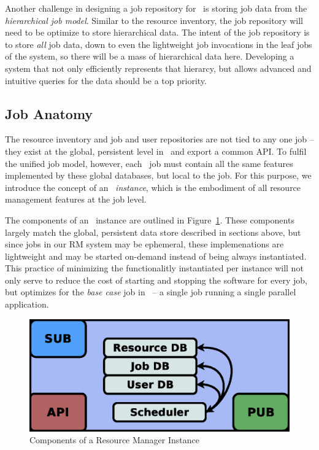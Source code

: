 Another challenge in designing a job repository for \ngrm\ is
storing job data from the \emph{hierarchical job model}. Similar
to the resource inventory, the job repository will need to be
optimize to store hierarchical data. The intent of the job
repository is to store \emph{all} job data, down to even the
lightweight job invocations in the leaf jobs of the system,
so there will be a mass of hierarchical data here. Developing
a system that not only efficiently represents that hierarcy,
but allows advanced and intuitive queries for the data should
be a top priority.

\subsection{Job Anatomy}

The resource inventory and job and user repositories are
not tied to any one job -- they exist at the global, persistent
level in \ngrm\ and export a common API.  To fulfil the unified
job model, however, each \ngrm\ job must contain all the
same features implemented by these global databases, but local
to the job. For this purpose, we introduce the concept of
an \ngrm\ \emph{instance}, which is the embodiment of all
resource management features at the job level.

The components of an \ngrm\ instance are outlined in
Figure~\ref{fig:rminstance}.  These components largely match the
global, persistent data store described in sections above, but since
jobs in our RM system may be ephemeral, these implemenations are
lightweight and may be started on-demand instead of being always
instantiated. This practice of minimizing the functionalitly
instantiated per instance will not only serve to reduce the cost
of starting and stopping the software for every job, but optimizes
for the \emph{base case} job in \ngrm\ -- a single job running a
single parallel application.

\begin{figure}
\centering
\includegraphics[scale=0.30]{../fig/RM-instance.eps}
\caption{Components of a Resource Manager Instance}
\label{fig:rminstance}
\end{figure}


